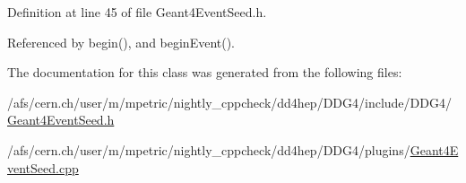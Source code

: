 Definition at line 45 of file Geant4\+Event\+Seed.\+h.



Referenced by begin(), and begin\+Event().



The documentation for this class was generated from the following files\+:\begin{DoxyCompactItemize}
\item 
/afs/cern.\+ch/user/m/mpetric/nightly\+\_\+cppcheck/dd4hep/\+D\+D\+G4/include/\+D\+D\+G4/\hyperlink{_geant4_event_seed_8h}{Geant4\+Event\+Seed.\+h}\item 
/afs/cern.\+ch/user/m/mpetric/nightly\+\_\+cppcheck/dd4hep/\+D\+D\+G4/plugins/\hyperlink{_geant4_event_seed_8cpp}{Geant4\+Event\+Seed.\+cpp}\end{DoxyCompactItemize}
